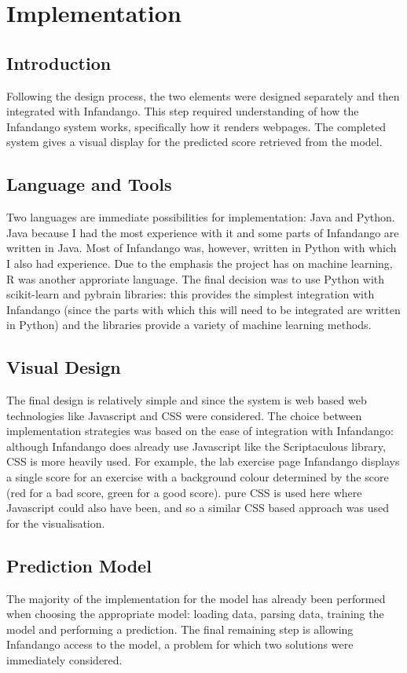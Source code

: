\chapter{Implementation}
\label{implementation}
\section{Introduction}
Following the design process, the two elements were designed separately and then integrated with Infandango. This step required understanding of how the Infandango system works, specifically how it renders webpages. The completed system gives a visual display for the predicted score retrieved from the model.

\section{Language and Tools}
Two languages are immediate possibilities for implementation: Java\cite{java_site} and Python\cite{python_site}. Java because I had the most experience with it and some parts of Infandango are written in Java. Most of Infandango was, however, written in Python with which I also had experience. Due to the emphasis the project has on machine learning, R\cite{r_site} was another approriate language. 
The final decision was to use Python with scikit-learn\cite{scikit_site} and pybrain\cite{pybrain2010jmlr} libraries: this provides the simplest integration with Infandango (since the parts with which this will need to be integrated are written in Python) and the libraries provide a variety of machine learning methods.

\section{Visual Design}
The final design is relatively simple and since the system is web based web technologies like Javascript and CSS were considered. The choice between implementation strategies was based on the ease of integration with Infandango: although Infandango does already use Javascript like the Scriptaculous library\cite{scriptaculous_site}, CSS is more heavily used. For example, the lab exercise page Infandango displays a single score for an exercise with a background colour determined by the score (red for a bad score, green for a good score). pure CSS is used here where Javascript could also have been, and so a similar CSS based approach was used for the visualisation.

\section{Prediction Model}
The majority of the implementation for the model has already been performed when choosing the appropriate model: loading data, parsing data, training the model and performing a prediction. The final remaining step is allowing Infandango access to the model, a problem for which two solutions were immediately considered.

